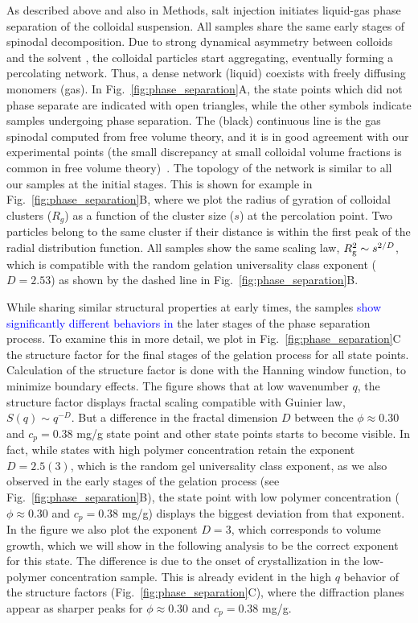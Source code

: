 \documentclass[12pt]{article}
\begin{document}
As described above and also in Methods, salt injection initiates liquid-gas phase separation of the colloidal suspension. 
All samples share the same early stages of spinodal decomposition. 
Due to strong dynamical asymmetry between colloids and the solvent \cite{tanaka1999colloid}, the colloidal particles start aggregating, 
eventually forming a percolating network. Thus, a dense network (liquid) coexists with freely diffusing monomers (gas).
In Fig.~\ref{fig:phase_separation}A, the state points which did not phase separate are indicated with open triangles, while
the other symbols indicate samples undergoing phase separation. The (black) continuous line is the gas spinodal computed from free volume theory,
and it is in good agreement with our experimental points (the small discrepancy at small colloidal volume fractions 
is common in free volume theory)~\cite{Royall2007,lu2008gelation}. 
The topology of the network is similar to all our samples at the initial stages. 
This is shown for example in Fig.~\ref{fig:phase_separation}B, where we plot the radius of gyration of colloidal clusters ($R_g$)
as a function of the cluster size ($s$) at the percolation point. Two particles belong to the same cluster if their distance is
within the first peak of the radial distribution function. All samples show the same scaling law, $R^2_{\rm g}\sim s^{2/D}$, which is compatible with
the random gelation universality class exponent ($D=2.53$) as shown by the dashed line in Fig.~\ref{fig:phase_separation}B.

While sharing similar structural properties at early times, the samples \textcolor{blue}{show significantly different behaviors in} the later stages of the phase separation process.
To examine this in more detail, we plot in Fig.~\ref{fig:phase_separation}C the structure factor for the final stages of the gelation process for all state points.
Calculation of the structure factor is done with the Hanning window function, to minimize boundary effects.
The figure shows that at low wavenumber $q$, the structure factor displays fractal scaling compatible with Guinier law, $S(q)\sim q^{-D}$.
But a difference in the fractal dimension $D$ between the $\phi\approx 0.30$ and $c_p=0.38$ mg/g state point and other state points starts to become visible. In fact, while states
with high polymer concentration retain the exponent $D=2.5(3)$, 
which is the random gel universality class exponent, as we also observed in the early stages of the gelation process (see Fig.~\ref{fig:phase_separation}B),
the state point with low polymer concentration ($\phi\approx 0.30$ and $c_p=0.38$ mg/g) displays the biggest deviation from that exponent. In the figure we also
plot the exponent $D=3$, which corresponds to volume growth, which we will show in the following analysis to be the correct exponent for this state. 
The difference is due to the onset of crystallization in the low-polymer concentration sample. This is already evident in the high $q$ behavior of
the structure factors (Fig.~\ref{fig:phase_separation}C), where the diffraction planes appear as sharper peaks for $\phi\approx 0.30$ and $c_p=0.38$ mg/g.
\end{document}
